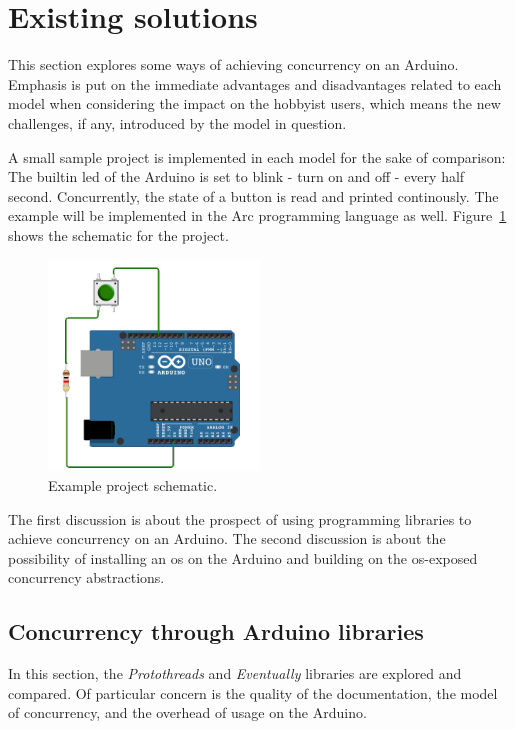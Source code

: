 \section{Existing solutions}\label{sec:existingsolutions}
This section explores some ways of achieving concurrency on an Arduino. Emphasis is put on the immediate advantages and disadvantages related to each model when considering the impact on the hobbyist users, which means the new challenges, if any, introduced by the model in question.

A small sample project is implemented in each model for the sake of comparison: The builtin \gls{led} of the Arduino is set to blink - turn on and off - every half second. Concurrently, the state of a button is read and printed continously. The example will be implemented in the Arc programming language as well. Figure~\ref{fig:exampleprojectschematic} shows the schematic for the project.


\begin{figure}[htb!]
  \centering
  \includegraphics[width=0.5\textwidth]{figures/Example_Project}
  \caption{Example project schematic.}
  \label{fig:exampleprojectschematic}
\end{figure}


The first discussion is about the prospect of using programming libraries to achieve concurrency on an Arduino. The second discussion is about the possibility of installing an \gls{os} on the Arduino and building on the \gls{os}-exposed concurrency abstractions.

\subsection{Concurrency through Arduino libraries}\label{subsec:arduinolibraries}
In this section, the \textit{Protothreads} and \textit{Eventually} libraries are explored and compared. Of particular concern is the quality of the documentation, the model of concurrency, and the overhead of usage on the Arduino.

